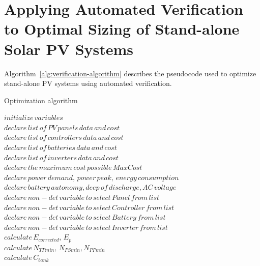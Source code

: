 \documentclass[10pt,conference]{IEEEtran}
\begin{document}
\section{Applying Automated Verification to Optimal Sizing of Stand-alone Solar PV Systems}

Algorithm~\ref{alg:verification-algorithm} describes the pseudocode used to optimize stand-alone PV systems using automated verification. 
%
 \begin{algorithm}
 \caption{Optimization algorithm}
 \begin{algorithmic}[1]
 \begin{scriptsize}
 
 \renewcommand{\algorithmicrequire}{\textbf{Input:}}
 \renewcommand{\algorithmicensure}{\textbf{Output:}}
  \STATE $initialize \, variables$ \\
  \STATE $declare \, list \, of \, PV \, panels \, data \, and \, cost $ \\
  \STATE $declare \, list \, of \, controllers \, data \, and \, cost $ \\
  \STATE $declare \, list \, of \, batteries \, data \,  and \, cost $ \\
  \STATE $declare \, list \, of \, inverters \, data \,  and \, cost $ \\
  \STATE $declare \, the \, maximum \, cost \, possible \, MaxCost $  \\
  \STATE $declare \, power \, demand, \, power \, peak, \, energy \, consumption $ \\
  \STATE $declare \, battery\,  autonomy, deep \, of \, discharge, AC \, voltage$ \\
 	\STATE $declare \, non-det \, variable \, to \, select \, Panel \, from \, list$ \\
 	\STATE $declare \, non-det \, variable \, to \, select \, Controller \, from \, list $ \\
 	\STATE $declare \, non-det \, variable \, to \, select \, Battery \, from \, list $ \\
 	\STATE $declare \, non-det \, variable \, to \, select \, Inverter \, from \, list $ \\ 	
 	\STATE $calculate \, E_{corrected}, \, E_{p} $ \\
	\STATE $calculate \, N_{TPmin}, \, N_{PSmin}, N_{PPmin} $ \\
 	\STATE $calculate \, C_{bank}$ \\

\end{scriptsize}
\end{algorithmic}
\end{algorithm}
\end{document}
